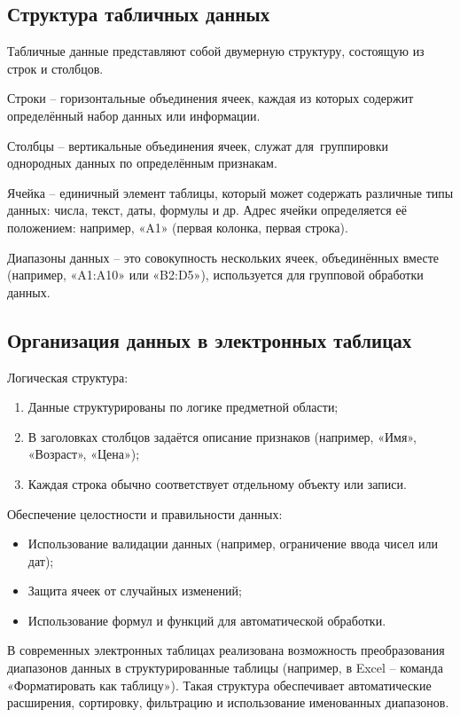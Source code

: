 \documentclass{ou}
\begin{document}
\subsection{Структура табличных данных}
Табличные данные представляют собой двумерную структуру, состоящую из строк и столбцов.

Строки -- горизонтальные объединения ячеек, каждая из которых содержит определённый набор данных или информации.

Столбцы -- вертикальные объединения ячеек, служат для~группировки однородных данных по определённым признакам.

Ячейка -- единичный элемент таблицы, который может содержать различные типы данных: числа, текст, даты, формулы и др. Адрес ячейки определяется её положением: например, «A1» (первая колонка, первая строка).

Диапазоны данных -- это совокупность нескольких ячеек, объединённых вместе (например, «A1:A10» или «B2:D5»), используется для групповой обработки данных.
\subsection{Организация данных в электронных таблицах}
Логическая структура:
\begin{enumerate}[leftmargin=0em, itemindent=3.75em, nosep, label=\arabic*)]
\item Данные структурированы по логике предметной области;
\item В заголовках столбцов задаётся описание признаков (например, «Имя», «Возраст», «Цена»);
\item Каждая строка обычно соответствует отдельному объекту или записи.
\end{enumerate}

Обеспечение целостности и правильности данных:
\begin{itemize}[label=-, leftmargin=0em, itemindent=3.35em, nosep]
\item Использование валидации данных (например, ограничение ввода чисел или дат);
\item Защита ячеек от случайных изменений;
\item Использование формул и функций для автоматической обработки.
\end{itemize}

В современных электронных таблицах реализована возможность преобразования диапазонов данных в структурированные таблицы (например, в Excel -- команда «Форматировать как таблицу»). Такая структура обеспечивает автоматические расширения, сортировку, фильтрацию и использование именованных диапазонов.
\end{document}
